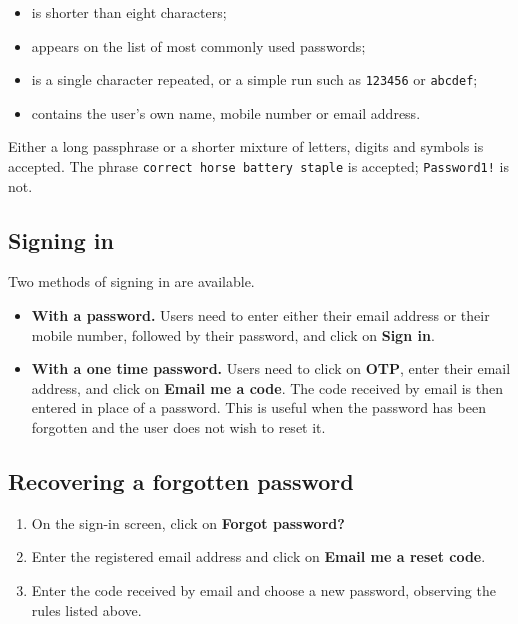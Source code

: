 \documentclass[11pt,a4paper]{article}
\begin{document}
\begin{itemize}
  \item is shorter than eight characters;
  \item appears on the list of most commonly used passwords;
  \item is a single character repeated, or a simple run such as \texttt{123456}
        or \texttt{abcdef};
  \item contains the user's own name, mobile number or email address.
\end{itemize}

Either a long passphrase or a shorter mixture of letters, digits and symbols is
accepted. The phrase \texttt{correct horse battery staple} is accepted;
\texttt{Password1!} is not.

\subsection{Signing in}

Two methods of signing in are available.

\begin{itemize}
  \item \textbf{With a password.} Users need to enter either their email address
        or their mobile number, followed by their password, and click on
        \textbf{Sign in}.
  \item \textbf{With a one time password.} Users need to click on \textbf{OTP},
        enter their email address, and click on \textbf{Email me a code}. The
        code received by email is then entered in place of a password. This is
        useful when the password has been forgotten and the user does not wish
        to reset it.
\end{itemize}

\subsection{Recovering a forgotten password}

\begin{enumerate}
  \item On the sign-in screen, click on \textbf{Forgot password?}
  \item Enter the registered email address and click on \textbf{Email me a reset
        code}.
  \item Enter the code received by email and choose a new password, observing
        the rules listed above.
\end{enumerate}
\end{document}
